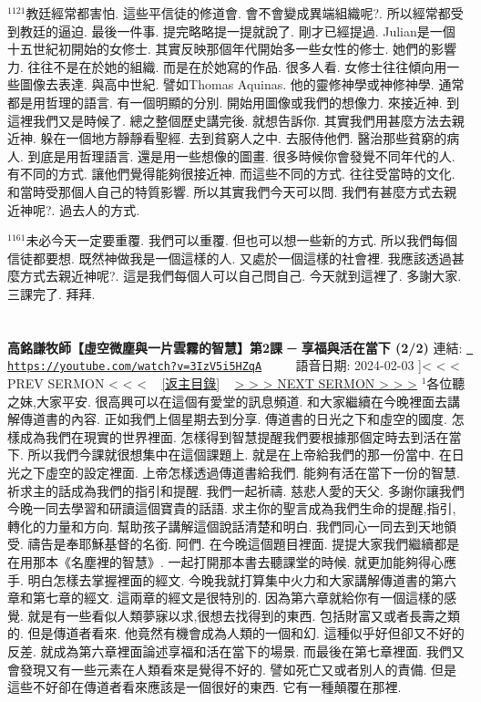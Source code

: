 \documentclass{book}
\begin{document}
$^{1121}$教廷經常都害怕.
這些平信徒的修道會.
會不會變成異端組織呢?.
所以經常都受到教廷的逼迫.
最後一件事.
提完略略提一提就說了.
剛才已經提過.
Julian是一個十五世紀初開始的女修士.
其實反映那個年代開始多一些女性的修士.
她們的影響力.
往往不是在於她的組織.
而是在於她寫的作品.
很多人看.
女修士往往傾向用一些圖像去表達.
與高中世紀.
譬如Thomas Aquinas.
他的靈修神學或神修神學.
通常都是用哲理的語言.
有一個明顯的分別.
開始用圖像或我們的想像力.
來接近神.
到這裡我們又是時候了.
總之整個歷史講完後.
就想告訴你.
其實我們用甚麼方法去親近神.
躲在一個地方靜靜看聖經.
去到貧窮人之中.
去服侍他們.
醫治那些貧窮的病人.
到底是用哲理語言.
還是用一些想像的圖畫.
很多時候你會發覺不同年代的人.
有不同的方式.
讓他們覺得能夠很接近神.
而這些不同的方式.
往往受當時的文化.
和當時受那個人自己的特質影響.
所以其實我們今天可以問.
我們有甚麼方式去親近神呢?.
過去人的方式.

$^{1161}$未必今天一定要重覆.
我們可以重覆.
但也可以想一些新的方式.
所以我們每個信徒都要想.
既然神做我是一個這樣的人.
又處於一個這樣的社會裡.
我應該透過甚麼方式去親近神呢?.
這是我們每個人可以自己問自己.
今天就到這裡了.
多謝大家.
三課完了.
拜拜.
\newpage



\section{}
\label{sec:3IzV5i5HZqA}
\textbf{高銘謙牧師【虛空微塵與一片雲霧的智慧】第2課 ─ 享福與活在當下 (2/2)}
\newline
\newline
連結: \href{https://youtube.com/watch?v=3IzV5i5HZqA}{\texttt{ https://youtube.com/watch?v=3IzV5i5HZqA}} ~~~~ 語音日期: 2024-02-03 
\newline
\newline
\hyperref[sec:nPtT6PycYE]]{\small{< < < PREV SERMON < < <}}
~
\hyperref[sec:index]{\small{[返主目錄]}}
~
\hyperref[sec:XJPrqJx8e0Y]{\small{> > > NEXT SERMON > > >}}
\newline
\newline
$^{1}$各位聽之妹,大家平安.
很高興可以在這個有愛堂的訊息頻道.
和大家繼續在今晚裡面去講解傳道書的內容.
正如我們上個星期去到分享.
傳道書的日光之下和虛空的國度.
怎樣成為我們在現實的世界裡面.
怎樣得到智慧提醒我們要根據那個定時去到活在當下.
所以我們今課就很想集中在這個課題上.
就是在上帝給我們的那一份當中.
在日光之下虛空的設定裡面.
上帝怎樣透過傳道書給我們.
能夠有活在當下一份的智慧.
祈求主的話成為我們的指引和提醒.
我們一起祈禱.
慈悲人愛的天父.
多謝你讓我們今晚一同去學習和研讀這個寶貴的話語.
求主你的聖言成為我們生命的提醒,指引,轉化的力量和方向.
幫助孩子講解這個說話清楚和明白.
我們同心一同去到天地領受.
禱告是奉耶穌基督的名銜.
阿們.
在今晚這個題目裡面.
提提大家我們繼續都是在用那本《名塵裡的智慧》.
一起打開那本書去聽課堂的時候.
就更加能夠得心應手.
明白怎樣去掌握裡面的經文.
今晚我就打算集中火力和大家講解傳道書的第六章和第七章的經文.
這兩章的經文是很特別的.
因為第六章就給你有一個這樣的感覺.
就是有一些看似人類夢寐以求,很想去找得到的東西.
包括財富又或者長壽之類的.
但是傳道者看來.
他竟然有機會成為人類的一個和幻.
這種似乎好但卻又不好的反差.
就成為第六章裡面論述享福和活在當下的場景.
而最後在第七章裡面.
我們又會發現又有一些元素在人類看來是覺得不好的.
譬如死亡又或者別人的責備.
但是這些不好卻在傳道者看來應該是一個很好的東西.
它有一種顛覆在那裡.
\end{document}
